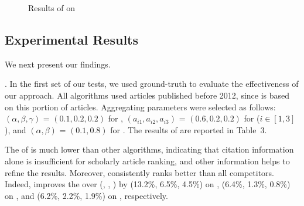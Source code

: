 {\begin{figure}[tb!]
\begin{center}
\end{center}
\vspace{-5ex}
\caption{Results of \PairAcc on \magdata}
\label{fig-future-period}
\vspace{-2ex}
\end{figure}
}







\subsection{Experimental Results}
\label{subsec-expres}

We next present our findings.

.
In the first set of our tests, we used ground-truth \recom to evaluate the effectiveness of our approach.
All algorithms used articles published before 2012, since \recom is based on this portion of articles.
Aggregating parameters were selected as follows: $(\alpha,\beta,\gamma)$ = $(0.1, 0.2, 0.2)$ for \futurerank, $(a_{i1},a_{i2},a_{i3})$ = $(0.6, 0.2, 0.2)$ for \hhgrank ($i\in[1,3]$), and $(\alpha,\beta)$ = $(0.1, 0.8)$ for \ensemblerank.
The results of \PairAcc are reported in Table~3.

The \PairAcc of \pagerank is much lower than other algorithms, indicating that citation information alone is insufficient for scholarly article ranking, and other information helps to refine the results. Moreover, \ensemblerank consistently ranks better than all competitors. Indeed, \ensemblerank improves the \PairAcc over (\pagerank, \futurerank, \hhgrank) by (13.2\%, 6.5\%, 4.5\%) on \aan, (6.4\%, 1.3\%, 0.8\%) on \aminer, and (6.2\%, 2.2\%, 1.9\%) on \magdata, respectively.


